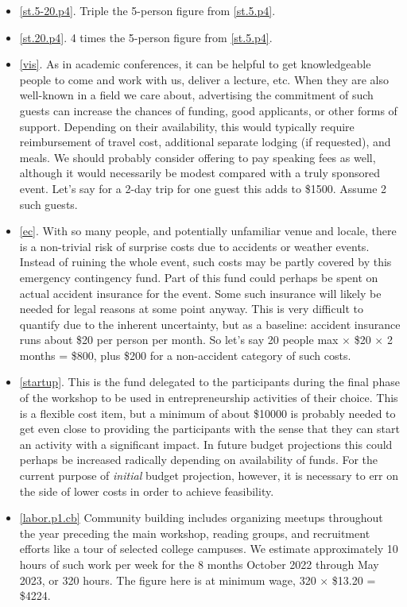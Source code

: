 \documentclass[10pt]{article}
\begin{document}
\begin{itemize}[leftmargin=*]
  \item[]{\ref{st.5-20.p4}. Triple the 5-person figure from  \ref{st.5.p4}.}
  \item[]{\ref{st.20.p4}. 4 times the 5-person figure from \ref{st.5.p4}.}
  \item[]{\ref{vis}. As in academic conferences, it can be helpful to get knowledgeable people to come and work with us, deliver a lecture, etc. When they are also well-known in a field we care about, advertising the commitment of such guests can increase the chances of funding, good applicants, or other forms of support. Depending on their availability, this would typically require reimbursement of travel cost, additional separate lodging (if requested), and meals. We should probably consider offering to pay speaking fees as well, although it would necessarily be modest compared with a truly sponsored event. Let's say for a 2-day trip for one guest this adds to \$1500. Assume 2 such guests.}
  \item[]{\ref{ec}. With so many people, and potentially unfamiliar venue and locale, there is a non-trivial risk of surprise costs due to accidents or weather events. Instead of ruining the whole event, such costs may be partly covered by this emergency contingency fund. Part of this fund could perhaps be spent on actual accident insurance for the event. Some such insurance will likely be needed for legal reasons at some point anyway. This is very difficult to quantify due to the inherent uncertainty, but as a baseline: accident insurance runs about \$20 per person per month. So let's say 20 people max $\times$ \$20 $\times$ 2 months = \$800, plus \$200 for a non-accident category of such costs.}
  \item[]{\ref{startup}. This is the fund delegated to the participants during the final phase of the workshop to be used in entrepreneurship activities of their choice. This is a flexible cost item, but a minimum of about \$10000 is probably needed to get even close to providing the participants with the sense that they can start an activity with a significant impact. In future budget projections this could perhaps be increased radically depending on availability of funds. For the current purpose of \emph{initial} budget projection, however, it is necessary to err on the side of lower costs in order to achieve feasibility.}
  \item[]{\ref{labor.p1.cb} Community building includes organizing meetups throughout the year preceding the main workshop, reading groups, and recruitment efforts like a tour of selected college campuses. We estimate approximately 10 hours of such work per week for the 8 months October 2022 through May 2023, or 320 hours. The figure here is at minimum wage, 320 $\times$ \$13.20 = \$4224.}

\end{itemize}
\end{document}
